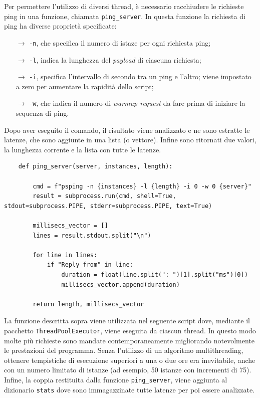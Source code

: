 Per permettere l'utilizzo di diversi thread, è necessario racchiudere le richieste ping in una funzione, chiamata \texttt{ping\_server}. In questa funzione la richiesta di ping ha diverse proprietà specificate:
\vspace{-3px}
\begin{itemize}
    \setlength{\itemsep}{-2px}
    \item[$\to$] \texttt{-n}, che specifica il numero di istaze per ogni richiesta ping;
    \item[$\to$] \texttt{-l}, indica la lunghezza del \textsl{payload} di ciascuna richiesta;
    \item[$\to$] \texttt{-i}, specifica l'intervallo di secondo tra un ping e l'altro; viene impostato a zero per aumentare la rapidità dello script;
    \item[$\to$] \texttt{-w}, che indica il numero di \textsl{warmup request} da fare prima di iniziare la sequenza di ping.
\end{itemize}
\noindent Dopo aver eseguito il comando, il risultato viene analizzato e ne sono estratte le latenze, che sono aggiunte in una lista (o vettore). Infine sono ritornati due valori, la lunghezza corrente e la lista con tutte le latenze.

\begin{lstlisting}
    def ping_server(server, instances, length):

        cmd = f"psping -n {instances} -l {length} -i 0 -w 0 {server}"
        result = subprocess.run(cmd, shell=True, stdout=subprocess.PIPE, stderr=subprocess.PIPE, text=True)

        millisecs_vector = []
        lines = result.stdout.split("\n")
        
        for line in lines:
            if "Reply from" in line:
                duration = float(line.split(": ")[1].split("ms")[0])
                millisecs_vector.append(duration)
        
        return length, millisecs_vector
\end{lstlisting}

\noindent La funzione descritta sopra viene utilizzata nel seguente script dove, mediante il pacchetto \texttt{ThreadPoolExecutor}, viene eseguita da ciascun thread. In questo modo molte più richieste sono mandate contemporaneamente migliorando notevolmente le prestazioni del programma. Senza l'utilizzo di un algoritmo multithreading, ottenere tempistiche di esecuzione superiori a una o due ore era inevitabile, anche con un numero limitato di istanze (ad esempio, 50 istanze con incrementi di 75). Infine, la coppia restituita dalla funzione \texttt{ping\_server}, viene aggiunta al dizionario \texttt{stats} dove sono immagazzinate tutte latenze per poi essere analizzate.

